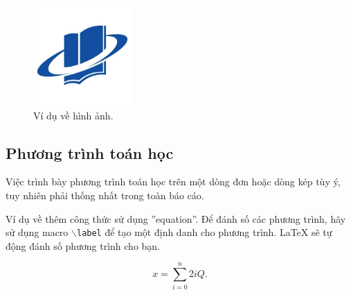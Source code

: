 \begin{figure}[ht]
\centering
\includegraphics[width=1.5in]{images/logo.jpg}
\caption{Ví dụ về hình ảnh.}
\label{fig_1}
\end{figure}


\subsection{Phương trình toán học}
Việc trình bày phương trình toán học trên một dòng đơn hoặc dòng kép tùy ý, tuy nhiên phải thống nhất trong toàn báo cáo.

Ví dụ về thêm công thức sử dụng ''equation''. Để đánh số các phương trình, hãy sử dụng macro $\backslash${\tt{label}} để tạo một định danh cho phương trình. LaTeX sẽ tự động đánh số phương trình cho bạn.

\begin{equation}
\label{deqn_ex1}
x = \sum_{i=0}^{n} 2{i} Q.
\end{equation}




